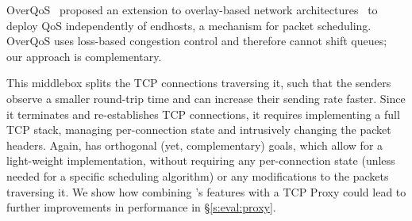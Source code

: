  OverQoS~\cite{overqos} proposed an extension to overlay-based network architectures~\cite{ron} to deploy QoS independently of endhosts, a mechanism for packet scheduling.
OverQoS uses loss-based congestion control and therefore cannot shift queues; our approach is complementary.

 This middlebox splits the TCP connections traversing it, such that the senders observe a smaller round-trip time and can increase their sending rate faster. Since it terminates and re-establishes TCP connections, it requires implementing a full TCP stack, managing per-connection state and intrusively changing the packet headers. Again, \name has orthogonal (yet, complementary) goals, which allow for a light-weight implementation, without requiring any per-connection state (unless needed for a specific scheduling algorithm) or any modifications to the packets traversing it. We show how combining \name's features with a TCP Proxy could lead to further improvements in performance in \S\ref{s:eval:proxy}. 


